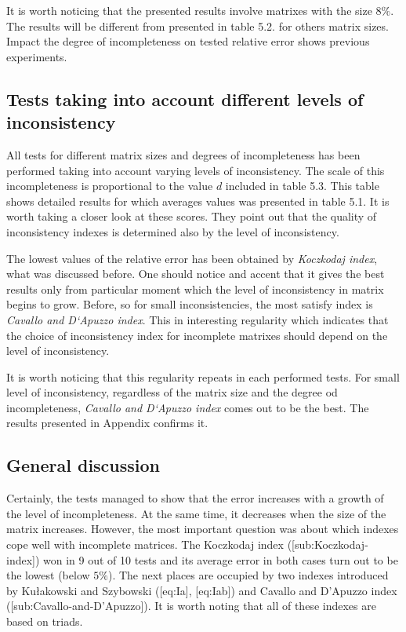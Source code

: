 It is worth noticing that the presented results involve matrixes with the size $8\%$. The results will be different from presented in table 5.2. for others matrix sizes. Impact the degree of incompleteness on tested relative error shows previous experiments.

\subsection{Tests taking into account different levels of inconsistency}
All tests for different matrix sizes and degrees of incompleteness has been performed taking into account varying levels of inconsistency. The scale of this incompleteness is proportional to the value $d$ included in table 5.3. This table shows detailed results for which averages values was presented in table 5.1. It is worth taking a closer look at these scores. They point out that the quality of inconsistency indexes is determined also by the level of inconsistency.

The lowest values of the relative error has been obtained by \textit{Koczkodaj index}, what was discussed before. One should notice and accent that it gives the best results only from particular moment which the level of inconsistency in matrix begins to grow. Before, so for small inconsistencies, the most satisfy index is \textit{Cavallo and D`Apuzzo index}. This in interesting regularity which indicates that the choice of inconsistency index for incomplete matrixes should depend on the level of inconsistency. 

It is worth noticing that this regularity repeats in each performed tests. For small level of inconsistency, regardless of the matrix size and the degree od incompleteness, \textit{Cavallo and D`Apuzzo index} comes out to be the best. The results presented in Appendix confirms it.


\subsection{General discussion}
Certainly, the tests managed to show that the error increases with a growth of the level of incompleteness. At the same time, it decreases when the size of the matrix increases. However, the most important question was about which indexes cope well with incomplete matrices. The Koczkodaj index ([sub:Koczkodaj-index]) won in 9 out of 10 tests and its average error in both cases turn out to be the lowest (below $5\%$). The next places are occupied by two indexes introduced by Kułakowski and Szybowski ([eq:Ia], [eq:Iab]) and Cavallo and D'Apuzzo index ([sub:Cavallo-and-D’Apuzzo]). It is worth noting that all of these indexes are based on triads.

